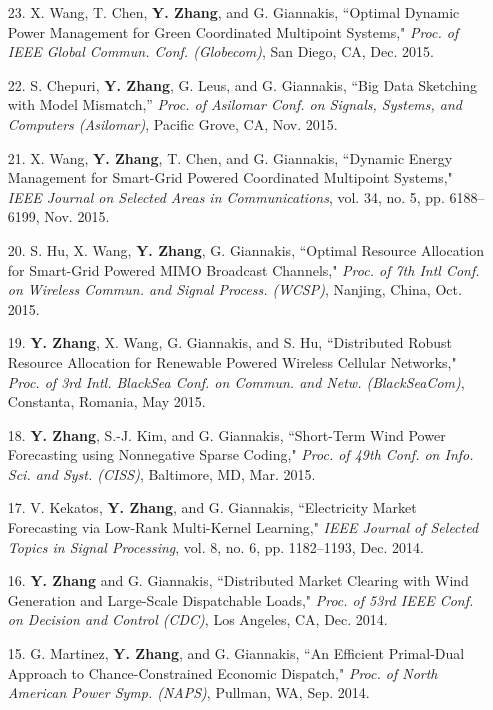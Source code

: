 \documentclass[margin,line]{res}
\begin{document}
\begin{resume}
\begin{enumerate}
\item[23.] X. Wang, T. Chen, \textbf{Y. Zhang}, and G. Giannakis,
``Optimal Dynamic Power Management for Green Coordinated Multipoint Systems,"
\emph{Proc. of IEEE Global Commun. Conf. (Globecom)}, San Diego, CA, Dec. 2015.

\item[22.] S. Chepuri, \textbf{Y. Zhang}, G. Leus, and G. Giannakis,
``Big Data Sketching with Model Mismatch,''
\emph{Proc. of Asilomar Conf. on Signals, Systems, and Computers (Asilomar)}, Pacific Grove, CA, Nov. 2015.


\item[21.]	X. Wang, \textbf{Y. Zhang}, T. Chen, and G. Giannakis,
``Dynamic Energy Management for Smart-Grid Powered Coordinated Multipoint Systems,"
\emph{IEEE Journal on Selected Areas in Communications}, vol. 34, no. 5, pp. 6188--6199, Nov. 2015.

\item[20.] S. Hu, X. Wang, \textbf{Y. Zhang}, G. Giannakis,
``Optimal Resource Allocation for Smart-Grid Powered MIMO Broadcast Channels,"
\emph{Proc. of 7th Intl Conf. on Wireless Commun. and Signal Process. (WCSP)}, Nanjing, China, Oct. 2015.

\item[19.]	\textbf{Y. Zhang}, X. Wang, G. Giannakis, and S. Hu,
``Distributed Robust Resource Allocation for Renewable Powered Wireless Cellular Networks,"
\emph{Proc. of 3rd Intl. BlackSea Conf. on Commun. and Netw. (BlackSeaCom)}, Constanta, Romania, May 2015.

\item[18.]	\textbf{Y. Zhang}, S.-J. Kim, and G. Giannakis,
``Short-Term Wind Power Forecasting using Nonnegative Sparse Coding,"
\emph{Proc. of 49th Conf. on Info. Sci. and Syst. (CISS)}, Baltimore, MD, Mar. 2015.


\item[17.] V. Kekatos, \textbf{Y. Zhang}, and G. Giannakis,
``Electricity Market Forecasting via Low-Rank Multi-Kernel Learning,"
\emph{IEEE Journal of Selected Topics in Signal Processing}, vol. 8, no. 6, pp. 1182--1193, Dec. 2014.

\item[16.]	\textbf{Y. Zhang} and G. Giannakis,
``Distributed Market Clearing with Wind Generation and Large-Scale Dispatchable Loads,"
\emph{Proc. of 53rd IEEE Conf. on Decision and Control (CDC)}, Los Angeles, CA, Dec. 2014.

\item[15.] G. Martinez, \textbf{Y. Zhang}, and G. Giannakis,
``An Efficient Primal-Dual Approach to Chance-Constrained Economic Dispatch,"
\emph{Proc. of North American Power Symp. (NAPS)}, Pullman, WA, Sep. 2014.


\end{enumerate}
\end{resume}
\end{document}
